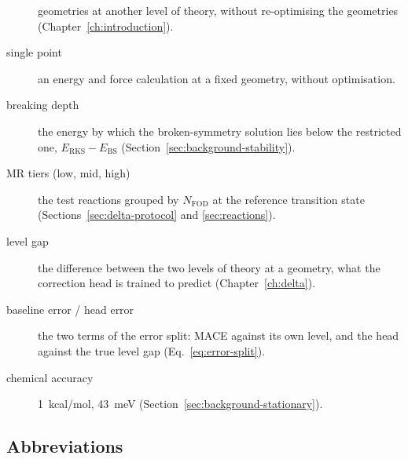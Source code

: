 \begin{description}
    geometries at another level of theory, without re-optimising the
    geometries (Chapter~\ref{ch:introduction}).
  \item[single point] an energy and force calculation at a fixed
    geometry, without optimisation.
  \item[breaking depth] the energy by which the broken-symmetry
    solution lies below the restricted one,
    $E_\mathrm{RKS} - E_\mathrm{BS}$
    (Section~\ref{sec:background-stability}).
  \item[MR tiers (low, mid, high)] the test reactions grouped by
    $N_\mathrm{FOD}$ at the reference transition state
    (Sections~\ref{sec:delta-protocol} and \ref{sec:reactions}).
  \item[level gap] the difference between the two levels of theory at a
    geometry, what the correction head is trained to predict
    (Chapter~\ref{ch:delta}).
  \item[baseline error / head error] the two terms of the error split:
    MACE against its own level, and the head against the true level gap
    (Eq.~\eqref{eq:error-split}).
  \item[chemical accuracy] 1~kcal/mol, 43~meV
    (Section~\ref{sec:background-stationary}).
\end{description}

\subsection*{Abbreviations}

